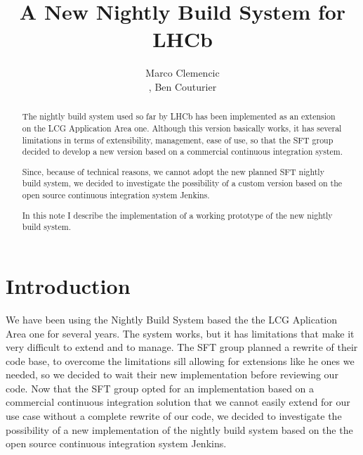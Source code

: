 \documentclass{lhcbnote}
\title{A New Nightly Build System for LHCb}
\author{Marco Clemencic\address[CERN]{CERN, Switzerland},
        Ben Couturier\addressmark[CERN]}
\begin{document}
\maketitle

\begin{abstract}
The nightly build system used so far by LHCb has been implemented as an
extension on the LCG Application Area one\cite{Kruzelecki:2010zz}.  Although
this version basically works, it has several limitations in terms of
extensibility, management, ease of use, so that the SFT group decided to develop
a new version based on a commercial continuous integration system.

Since, because of technical reasons, we cannot adopt the new planned SFT nightly
build system, we decided to investigate the possibility of a custom version
based on the open source continuous integration system Jenkins\cite{Jenkins}.

In this note I describe the implementation of a working prototype of the new
nightly build system.
\end{abstract}

\begin{status}
\end{status}

\tableofcontents

\listoffigures
\listoftables

\section{Introduction}
We have been using the Nightly Build System based the the LCG Aplication Area
one for several years\cite{Kruzelecki:2010zz}.  The system works, but it has
limitations that make it very difficult to extend and to manage.  The SFT group
planned a rewrite of their code base, to overcome the limitations sill allowing
for extensions like he ones we needed, so we decided to wait their new
implementation before reviewing our code.  Now that the SFT group opted for an
implementation based on a commercial continuous integration solution that we
cannot easily extend for our use case without a complete rewrite of our code, we
decided to investigate the possibility of a new implementation of the nightly
build system based on the the open source continuous integration system
Jenkins\cite{Jenkins}.
\end{document}
